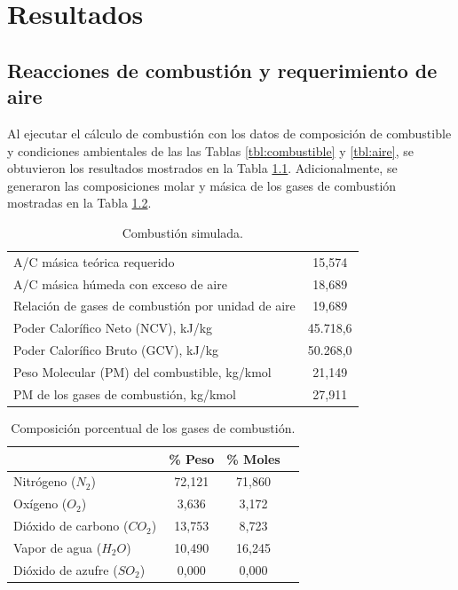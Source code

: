 \chapter{Resultados}

\section{Reacciones de combustión y requerimiento de aire}
\par Al ejecutar el cálculo de combustión con los datos de composición de combustible y condiciones ambientales de las las Tablas \ref{tbl:combustible} y \ref{tbl:aire}, se obtuvieron los resultados mostrados en la Tabla \ref{tbl:combustion-data}. Adicionalmente, se generaron las composiciones molar y másica de los gases de combustión mostradas en la Tabla \ref{tbl:combustion-gas}.
\begin{table}[hbt] \begin{center}
\caption[Combustión simulada]{Combustión simulada.}
\label{tbl:combustion-data} \begin{tabular}{l|c}
	A/C másica teórica requerido					& 15,574 \\
	A/C másica húmeda con exceso de aire			& 18,689 \\
	Relación de gases de combustión por unidad de aire& 19,689 \\
	Poder Calorífico Neto  (NCV), kJ/kg				& 45.718,6 \\
	Poder Calorífico Bruto (GCV), kJ/kg				& 50.268,0 \\
	Peso Molecular (PM) del combustible, kg/kmol	& 21,149 \\
	PM de los gases de combustión, kg/kmol				& 27,911 \\
\end{tabular} \end{center} \end{table}
\begin{table}[htb] \begin{center}
\caption[Composición de los gases de combustión]
{Composición porcentual de los gases de combustión.}
\label{tbl:combustion-gas} \begin{tabular}{l|c|c|c}
	   & \% Peso & \% Moles \\
	\hline
	Nitrógeno ($N_2$)			& 72,121	& 71,860 \\
	Oxígeno ($O_2$)				& 3,636 	& 3,172	 \\
	Dióxido de carbono ($CO_2$)	& 13,753	& 8,723	 \\
	Vapor de agua ($H_2O$)		& 10,490	& 16,245 \\
	Dióxido de azufre ($SO_2$)	& 0,000 	& 0,000	 \\
\end{tabular} \end{center} \end{table}

